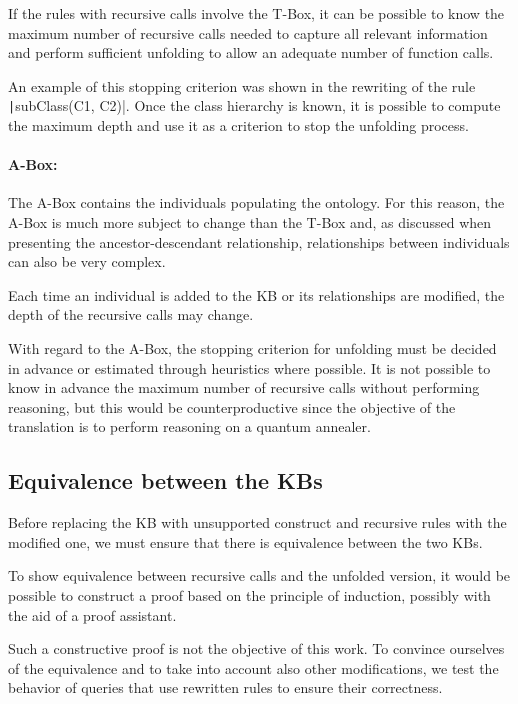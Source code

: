 If the rules with recursive calls involve the T-Box, it can be possible to know the maximum number of recursive calls needed to capture all relevant information and perform sufficient unfolding to allow an adequate number of function calls.

An example of this stopping criterion was shown in the rewriting of the rule \texttt|subClass(C1, C2)|. Once the class hierarchy is known, it is possible to compute the maximum depth and use it as a criterion to stop the unfolding process.

\paragraph{A-Box:} The A-Box contains the individuals populating the ontology. For this reason, the A-Box is much more subject to change than the T-Box and, as discussed when presenting the ancestor-descendant relationship, relationships between individuals can also be very complex.

Each time an individual is added to the KB or its relationships are modified, the depth of the recursive calls may change.

With regard to the A-Box, the stopping criterion for unfolding must be decided in advance or estimated through heuristics where possible. It is not possible to know in advance the maximum number of recursive calls without performing reasoning, but this would be counterproductive since the objective of the translation is to perform reasoning on a quantum annealer.

\subsection{Equivalence between the KBs}
Before replacing the KB with unsupported construct and recursive rules with the modified one, we must ensure that there is equivalence between the two KBs. 

To show equivalence between recursive calls and the unfolded version, it would be possible to construct a proof based on the principle of induction, possibly with the aid of a proof assistant.

Such a constructive proof is not the objective of this work. To convince ourselves of the equivalence and to take into account also other modifications, we test the behavior of queries that use rewritten rules to ensure their correctness.

